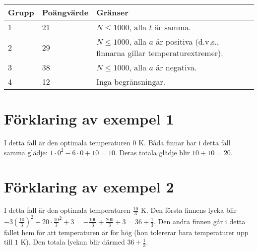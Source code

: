 \noindent
\begin{tabular}{| l | l | l |}
\hline
Grupp & Poängvärde & Gränser \\ \hline
1     & 21         & $N \le 1000$, alla $t$ är samma. \\ \hline
2     & 29         & $N \le 1000$, alla $a$ är positiva (d.v.s., finnarna gillar temperaturextremer). \\ \hline
3     & 38         & $N \le 1000$, alla $a$ är negativa. \\ \hline
4     & 12         & Inga begränsningar. \\ \hline
\end{tabular}

\section*{Förklaring av exempel 1}
I detta fall är den optimala temperaturen $0 \textrm{ K}$.
Båda finnar har i detta fall samma glädje: $1 \cdot 0^2 -6\cdot 0 + 10 = 10$.
Deras totala glädje blir $10 + 10 = 20$.

\section*{Förklaring av exempel 2}
I detta fall är den optimala temperaturen $\frac{10}{3} \textrm{ K}$.
Den första finnens lycka blir $-3(\frac{10}{3})^2 + 20 \cdot \frac{10}{3}^2 + 3 = -\frac{100}{3} + \frac{200}{3} + 3 = 36 + \frac{1}{3}$.
Den andra finnen går i detta fallet hem för att temperaturen är för hög (hon tolererar bara temperaturer upp till $1\textrm{ K}$).
Den totala lyckan blir därmed $36 + \frac{1}{3}$.

